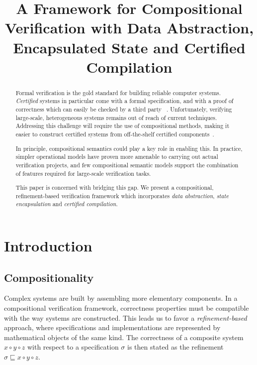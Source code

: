 \documentclass[acmsmall,screen,review,anonymous]{acmart}
\title{A Framework for Compositional Verification with
  Data Abstraction, Encapsulated State and Certified Compilation}
\begin{document}
\newtheorem{remark}[theorem]{Remark}

\begin{abstract} %
Formal verification is the gold standard
for building reliable computer systems.
\emph{Certified} systems in particular
come with a formal specification,
and with a proof of correctness
which can easily be checked by a third party~%
\cite{shao10}.
Unfortunately, verifying large-scale, heterogeneous systems
remains out of reach of current techniques.
Addressing this challenge
will require the use of compositional methods,
making it easier to construct certified systems
from off-the-shelf certified components~\cite{deepspec}.

In principle,
compositional semantics
could play a key role in enabling this.
In practice, simpler operational models
have proven more amenable
to carrying out actual verification projects,
and few compositional semantic models
support the combination of features
required for large-scale verification tasks.

This paper is concerned with bridging this gap.
We present a compositional, refinement-based verification framework
which incorporates
\emph{data abstraction},
\emph{state encapsulation} and
\emph{certified compilation}.
\end{abstract}


\maketitle

\section{Introduction} \label{sec:intro} %



\subsection{Compositionality} %

Complex systems are built by assembling more elementary components.
In a compositional verification framework,
correctness properties must be compatible with
the way systems are constructed.
This leads us to favor a \emph{refinement-based} approach,
where specifications and implementations
are represented by mathematical objects of the same kind.
The correctness of a composite system $x \circ y \circ z$
with respect to a specification $\sigma$
is then stated as the refinement
$\sigma \sqsubseteq x \circ y \circ z$.
\end{document}
